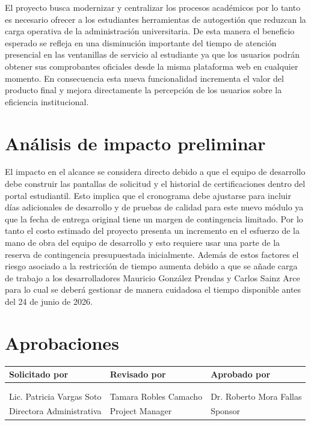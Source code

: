 \documentclass[11pt,spanish]{article}
\begin{document}
El proyecto busca modernizar y centralizar los procesos académicos por lo tanto es necesario ofrecer a los estudiantes herramientas de autogestión que reduzcan la carga operativa de la administración universitaria. De esta manera el beneficio esperado se refleja en una disminución importante del tiempo de atención presencial en las ventanillas de servicio al estudiante ya que los usuarios podrán obtener sus comprobantes oficiales desde la misma plataforma web en cualquier momento. En consecuencia esta nueva funcionalidad incrementa el valor del producto final y mejora directamente la percepción de los usuarios sobre la eficiencia institucional.

\section{Análisis de impacto preliminar}

El impacto en el alcance se considera directo debido a que el equipo de desarrollo debe construir las pantallas de solicitud y el historial de certificaciones dentro del portal estudiantil. Esto implica que el cronograma debe ajustarse para incluir días adicionales de desarrollo y de pruebas de calidad para este nuevo módulo ya que la fecha de entrega original tiene un margen de contingencia limitado. Por lo tanto el costo estimado del proyecto presenta un incremento en el esfuerzo de la mano de obra del equipo de desarrollo y esto requiere usar una parte de la reserva de contingencia presupuestada inicialmente. Además de estos factores el riesgo asociado a la restricción de tiempo aumenta debido a que se añade carga de trabajo a los desarrolladores Mauricio González Prendas y Carlos Sainz Arce para lo cual se deberá gestionar de manera cuidadosa el tiempo disponible antes del 24 de junio de 2026.

\section{Aprobaciones}

\begin{table}[H]
\centering
\begin{tabularx}{\textwidth}{Y Y Y}
\toprule
\textbf{Solicitado por} & \textbf{Revisado por} & \textbf{Aprobado por} \\
\midrule
& & \\
& & \\
Lic. Patricia Vargas Soto & Tamara Robles Camacho & Dr. Roberto Mora Fallas \\
Directora Administrativa & Project Manager & Sponsor \\
\bottomrule
\end{tabularx}
\end{table}
\end{document}
